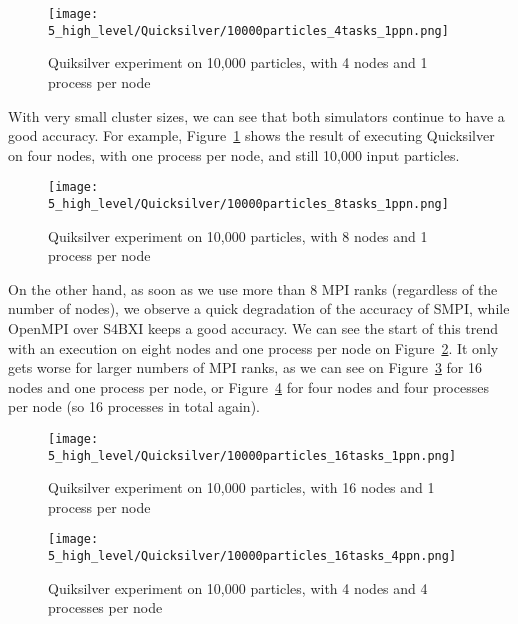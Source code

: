 \begin{figure}[!tb]
    \centering
    \texttt{[image: 5\_high\_level/Quicksilver/10000particles\_4tasks\_1ppn.png]}
    \caption{Quiksilver experiment on 10,000 particles, with 4 nodes and 1 process per node}
    \label{fig:5_high_level:quicksilver_4tasks_1ppn}
\end{figure}


With very small cluster sizes, we can see that both simulators continue to have
a good accuracy. For example,
Figure~\ref{fig:5_high_level:quicksilver_4tasks_1ppn} shows the result of
executing Quicksilver on four nodes, with one process per node, and still 10,000
input particles.


\begin{figure}[!tb]
    \centering
    \texttt{[image: 5\_high\_level/Quicksilver/10000particles\_8tasks\_1ppn.png]}
    \caption{Quiksilver experiment on 10,000 particles, with 8 nodes and 1 process per node}
    \label{fig:5_high_level:quicksilver_8tasks_1ppn}
\end{figure}

On the other hand, as soon as we use more than 8 MPI ranks (regardless of the
number of nodes), we observe a quick degradation of the accuracy of SMPI, while
OpenMPI over S4BXI keeps a good accuracy. We can see the start of this trend
with an execution on eight nodes and one process per node on
Figure~\ref{fig:5_high_level:quicksilver_8tasks_1ppn}. It only gets worse for
larger numbers of MPI ranks, as we can see on
Figure~\ref{fig:5_high_level:quicksilver_16tasks_1ppn} for 16 nodes and one
process per node, or Figure~\ref{fig:5_high_level:quicksilver_16tasks_4ppn} for
four nodes and four processes per node (so 16 processes in total again).


\begin{figure}[!tb]
    \centering
    \texttt{[image: 5\_high\_level/Quicksilver/10000particles\_16tasks\_1ppn.png]}
    \caption{Quiksilver experiment on 10,000 particles, with 16 nodes and 1 process per node}
    \label{fig:5_high_level:quicksilver_16tasks_1ppn}
\end{figure}

\begin{figure}[!tb]
    \centering
    \texttt{[image: 5\_high\_level/Quicksilver/10000particles\_16tasks\_4ppn.png]}
    \caption{Quiksilver experiment on 10,000 particles, with 4 nodes and 4 processes per node}
    \label{fig:5_high_level:quicksilver_16tasks_4ppn}
\end{figure}

